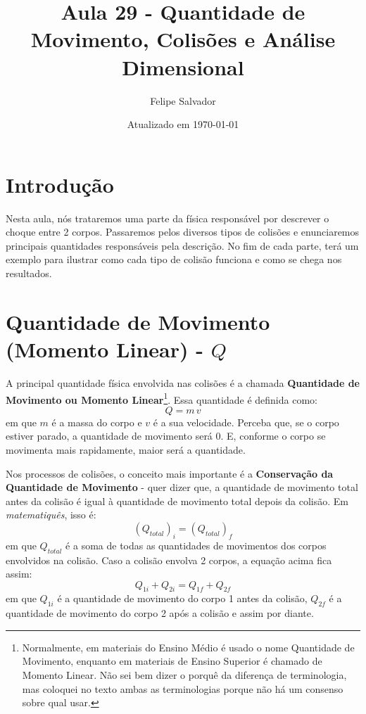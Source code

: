 \documentclass[12pt]{extarticle}
\title{Aula 29 - Quantidade de Movimento, Colisões e Análise Dimensional}
\author{Felipe Salvador}
\date{Atualizado em \today}
\newcommand{\<}{\langle}
\renewcommand{\>}{\rangle}
\theoremstyle{definition}
\begin{document}
\maketitle

\section{Introdução}
Nesta aula, nós trataremos uma parte da física responsável por descrever o choque entre 2 corpos. Passaremos pelos diversos tipos de colisões e enunciaremos principais quantidades responsáveis pela descrição. No fim de cada parte, terá um exemplo para ilustrar como cada tipo de colisão funciona e como se chega nos resultados.

\section{Quantidade de Movimento (Momento Linear) - $Q$}

A principal quantidade física envolvida nas colisões é a chamada \textbf{Quantidade de Movimento ou Momento Linear}\footnote{Normalmente, em materiais do Ensino Médio é usado o nome Quantidade de Movimento, enquanto em materiais de Ensino Superior é chamado de Momento Linear. Não sei bem dizer o porquê da diferença de terminologia, mas coloquei no texto ambas as terminologias porque não há um consenso sobre qual usar.}. Essa quantidade é definida como:
\begin{equation}
    Q = m\,v
\end{equation}
\noindent em que $m$ é a massa do corpo e $v$ é a sua velocidade. Perceba que, se o corpo estiver parado, a quantidade de movimento será 0. E, conforme o corpo se movimenta mais rapidamente, maior será a quantidade.

Nos processos de colisões, o conceito mais importante é a \textbf{Conservação da Quantidade de Movimento} - quer dizer que, a quantidade de movimento total antes da colisão é igual à quantidade de movimento total depois da colisão. Em \textit{matematiquês}, isso é:
\begin{equation}
    (Q_{total})_i = (Q_{total})_f
\end{equation}
\noindent em que $Q_{total}$ é a soma de todas as quantidades de movimentos dos corpos envolvidos na colisão.
Caso a colisão envolva 2 corpos, a equação acima fica assim:
\begin{equation}
    Q_{1i} + Q_{2i} = Q_{1f} + Q_{2f}
\end{equation}
\noindent em que $Q_{1i}$ é a quantidade de movimento do corpo 1 antes da colisão, $Q_{2f}$ é a quantidade de movimento do corpo 2 após a colisão e assim por diante.
\end{document}

